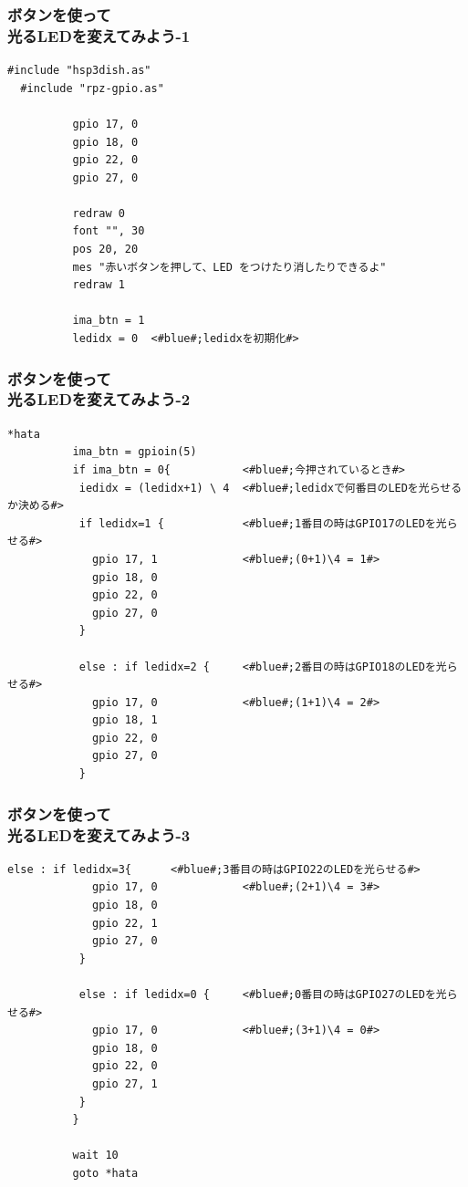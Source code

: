 \begin{frame}[fragile]
  \frametitle{ボタンを使って\\光るLEDを変えてみよう-1}
  \begin{lstlisting}[title=\sim/03/button\_led3.hsp 前半, label=button_led3.hsp-1]
  #include "hsp3dish.as"
  #include "rpz-gpio.as"
  
          gpio 17, 0   
          gpio 18, 0
          gpio 22, 0
          gpio 27, 0

          redraw 0
          font "", 30
          pos 20, 20
          mes "赤いボタンを押して、LED をつけたり消したりできるよ"
          redraw 1

          ima_btn = 1 
          ledidx = 0  <#blue#;ledidxを初期化#>
  \end{lstlisting}
\end{frame}

\begin{frame}[fragile]
  \frametitle{ボタンを使って\\光るLEDを変えてみよう-2}
  \begin{lstlisting}[title=\sim/03/button\_led3.hsp 中盤, label=button_led3.hsp-2]
  *hata
          ima_btn = gpioin(5)
          if ima_btn = 0{           <#blue#;今押されているとき#>
           iedidx = (ledidx+1) \ 4  <#blue#;ledidxで何番目のLEDを光らせるか決める#>
           if ledidx=1 {            <#blue#;1番目の時はGPIO17のLEDを光らせる#>
             gpio 17, 1             <#blue#;(0+1)\4 = 1#>
             gpio 18, 0 
             gpio 22, 0
             gpio 27, 0
           }

           else : if ledidx=2 {     <#blue#;2番目の時はGPIO18のLEDを光らせる#>
             gpio 17, 0             <#blue#;(1+1)\4 = 2#>
             gpio 18, 1
             gpio 22, 0
             gpio 27, 0
           }
  \end{lstlisting}
\end{frame}

\begin{frame}[fragile]
  \frametitle{ボタンを使って\\光るLEDを変えてみよう-3}
  \begin{lstlisting}[title=button\_led3.hsp 後半, label=button_led3.hsp-3]
           else : if ledidx=3{      <#blue#;3番目の時はGPIO22のLEDを光らせる#>
             gpio 17, 0             <#blue#;(2+1)\4 = 3#>
             gpio 18, 0
             gpio 22, 1
             gpio 27, 0
           }

           else : if ledidx=0 {     <#blue#;0番目の時はGPIO27のLEDを光らせる#>
             gpio 17, 0             <#blue#;(3+1)\4 = 0#>
             gpio 18, 0
             gpio 22, 0
             gpio 27, 1
           }
          }

          wait 10
          goto *hata
  \end{lstlisting}
\end{frame}

